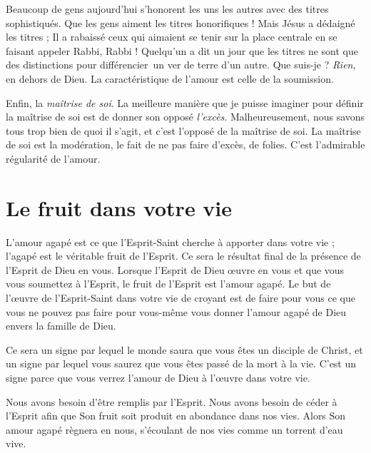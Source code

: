 Beaucoup de gens aujourd'hui s'honorent les uns les autres
 avec des titres sophistiqués. Que les gens aiment les titres honorifiques !
 Mais Jésus a dédaigné les titres ; Il a rabaissé ceux qui aimaient
 se tenir sur la place centrale en se faisant appeler\frcolon{}
 \Og Rabbi, Rabbi ! \Fg{}
 Quelqu'un a dit un jour que les titres ne sont que des distinctions
 pour différencier~un ver de terre d'un autre. Que suis-je ?
 \emph{Rien}, en dehors de Dieu. La caractéristique de l'amour
 est celle de la soumission.

Enfin, la \emph{maîtrise de soi}. La meilleure manière que je puisse imaginer
 pour définir la maîtrise de soi est de donner son opposé\frcolon{} \emph{l'excès}.
 Malheureusement, nous savons tous trop bien de quoi il s'agit,
 et c'est l'opposé de la maîtrise de soi.
 La maîtrise de soi est la modération, le fait de ne pas faire d'excès, de folies.
 C'est l'admirable régularité de l'amour.


\section{Le fruit dans votre vie}

L'amour agapé est ce que l'Esprit-Saint cherche à apporter dans votre vie ;
 l'agapé est le véritable fruit de l'Esprit.
 Ce sera le résultat final de la présence de l'Esprit de Dieu en vous.
 Lorsque l'Esprit de Dieu œuvre en vous et que vous vous soumettez à l'Esprit,
 le fruit de l'Esprit est l'amour agapé. Le but de l'œuvre de
 l'Esprit-Saint dans votre vie de croyant est de faire pour vous
 ce que vous ne pouvez pas faire pour vous-même\frcolon{}
 vous donner l'amour agapé de Dieu envers la famille de Dieu.

Ce sera un signe par lequel le monde saura que vous êtes un disciple
 de Christ, et un signe par lequel vous saurez que vous êtes passé
 de la mort à la vie. C'est un signe parce que vous verrez
 l'amour de Dieu à l'œuvre dans votre vie.

Nous avons besoin d'être remplis par l'Esprit.
 Nous avons besoin de céder à l'Esprit afin que Son fruit soit produit
 en abondance dans nos vies. Alors Son amour agapé règnera en nous,
 s'écoulant de nos vies comme un torrent d'eau vive.
\closechapter
{}

